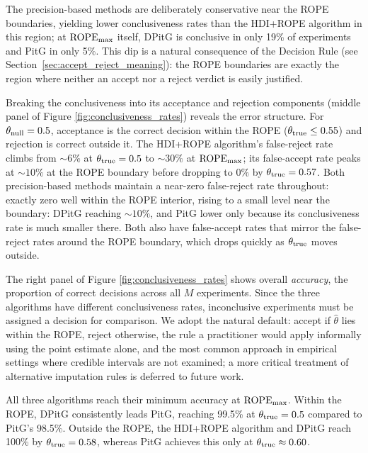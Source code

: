 The precision-based methods are deliberately conservative near the ROPE boundaries,
yielding lower conclusiveness rates than the HDI+ROPE algorithm in this region; at ${\rm ROPE}_{\rm max}$
itself, DPitG is conclusive in only 19\% of experiments and PitG in only 5\%.
This dip is a natural consequence of the Decision Rule
(see Section~\ref{sec:accept_reject_meaning}): the ROPE boundaries are exactly the region
where neither an accept nor a reject verdict is easily justified.

Breaking the conclusiveness into its acceptance and rejection components (middle panel of Figure \ref{fig:conclusiveness_rates})
reveals the error structure.
For $\theta_{\rm null}=0.5$, acceptance is the correct decision within the ROPE
($\theta_{\rm true}\le 0.55$) and rejection is correct outside it.
The HDI+ROPE algorithm's false-reject rate climbs from $\sim\!6\%$ at $\theta_{\rm true}=0.5$
to $\sim\!30\%$ at ${\rm ROPE}_{\rm max}$; its false-accept rate peaks at
$\sim\!10\%$ at the ROPE boundary before dropping to $0\%$ by
$\theta_{\rm true}=0.57$. Both precision-based methods maintain a near-zero false-reject rate throughout:
exactly zero well within the ROPE interior, rising to a small level near the boundary:
DPitG reaching $\sim\!10\%$, and PitG lower only because its
conclusiveness rate is much smaller there.
Both also have false-accept rates that mirror the false-reject rates around
the ROPE boundary, which drops quickly as $\theta_{\rm true}$ moves outside.

The right panel of Figure \ref{fig:conclusiveness_rates} shows overall \textit{accuracy}, the proportion of correct decisions
across all $M$ experiments. Since the three algorithms have different conclusiveness
rates, inconclusive experiments must be assigned a decision for comparison.
We adopt the natural default: accept if $\hat{\theta}$ lies within the ROPE, reject
otherwise, the rule a practitioner would apply informally using the point estimate
alone, and the most common approach in empirical settings where credible intervals are
not examined; a more critical treatment of alternative imputation rules is deferred
to future work.

All three algorithms reach their minimum accuracy at ${\rm ROPE}_{\rm max}$. Within
the ROPE, DPitG consistently leads PitG, reaching 99.5\% at $\theta_{\rm true}=0.5$
compared to PitG's 98.5\%. Outside the ROPE, the HDI+ROPE algorithm and DPitG reach 100\% by
$\theta_{\rm true}=0.58$, whereas PitG achieves this only at
$\theta_{\rm true}\approx 0.60$.

